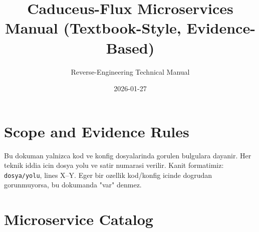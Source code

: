 \documentclass[10pt,a4paper]{article}
\title{Caduceus-Flux Microservices Manual (Textbook-Style, Evidence-Based)}
\author{Reverse-Engineering Technical Manual}
\date{2026-01-27}
\begin{document}
\maketitle
\tableofcontents
\newpage

\section{Scope and Evidence Rules}

Bu dokuman yalnizca kod ve konfig dosyalarinda gorulen bulgulara dayanir. Her teknik iddia icin dosya yolu ve satir numarasi verilir. Kanit formatimiz: \texttt{dosya/yolu}, lines X--Y. Eger bir ozellik kod/konfig icinde dogrudan gorunmuyorsa, bu dokumanda "var" denmez.

\section{Microservice Catalog}
\end{document}
